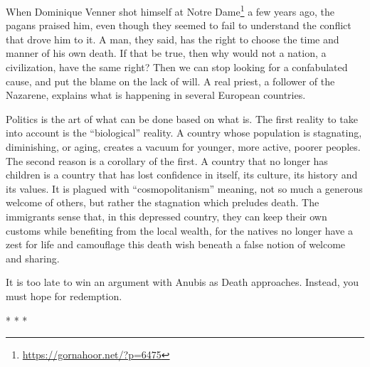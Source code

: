 When Dominique Venner shot himself at Notre Dame\footnote{\url{https://gornahoor.net/?p=6475}} a few years ago, the pagans praised him, even though they seemed to fail to understand the conflict that drove him to it. A man, they said, has the right to choose the time and manner of his own death. If that be true, then why would not a nation, a civilization, have the same right? Then we can stop looking for a confabulated cause, and put the blame on the lack of will. A real priest, a follower of the Nazarene, explains what is happening in several European countries.

\begin{quotex}
Politics is the art of what can be done based on what is. The first reality to take into account is the ``biological'' reality. A country whose population is stagnating, diminishing, or aging, creates a vacuum for younger, more active, poorer peoples. The second reason is a corollary of the first. A country that no longer has children is a country that has lost confidence in itself, its culture, its history and its values. It is plagued with ``cosmopolitanism'' meaning, not so much a generous welcome of others, but rather the stagnation which preludes death. The immigrants sense that, in this depressed country, they can keep their own customs while benefiting from the local wealth, for the natives no longer have a zest for life and camouflage this death wish beneath a false notion of welcome and sharing.
\end{quotex}


It is too late to win an argument with Anubis as Death approaches. Instead, you must hope for redemption.



\begin{center}* * *\end{center}


